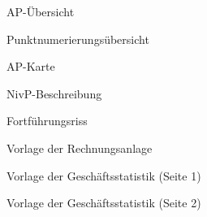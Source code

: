 \begin{figure}[htbp]
	\centering
	\caption{AP-Übersicht}
	\label{fig:ap-uebersicht}
\end{figure}
\begin{figure}[htbp]
	\centering
	\caption{Punktnumerierungsübersicht}
	\label{fig:punktnumerierungsuebersicht}
\end{figure}
\begin{figure}[htbp]
	\centering
	\caption{AP-Karte}
	\label{fig:ap-karte}
\end{figure}
\begin{figure}[htbp]
	\centering
	\caption{NivP-Beschreibung}
	\label{fig:nivp-beschreibung}
\end{figure}
\begin{figure}[htbp]
	\centering
	\caption{Fortführungsriss}
	\label{fig:fortfuehrungsriss}
\end{figure}
\begin{figure}[htbp]
	\centering
	\caption{Vorlage der Rechnungsanlage}
	\label{fig:vorlage_rechnungsanlage}
\end{figure}
\begin{figure}[htbp]
	\centering
	\caption{Vorlage der Geschäftsstatistik (Seite 1)}
	\label{fig:vorlage_geschaeftsstatistik_1}
\end{figure}
\begin{figure}[htbp]
	\centering
	\caption{Vorlage der Geschäftsstatistik (Seite 2)}
	\label{fig:vorlage_geschaeftsstatistik_2}
\end{figure}


